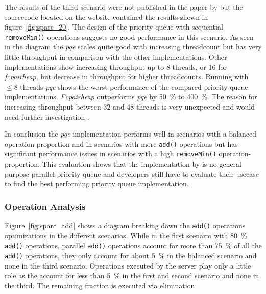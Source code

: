 The results of the third scenario were not published in the paper by \citeauthor{calciu_adaptive_2014} but the sourcecode located on the  website contained the results shown in figure~\ref{fig:sparc_20}. The design of the priority queue with sequential \texttt{removeMin()} operations suggests no good performance in this scenario. As seen in the diagram the \textit{pqe} scales quite good with increasing threadcount but has very little throughput in comparison with the other implementations. Other implementations show increasing throughput up to 8 threads, or 16 for \textit{fcpairheap}, but decrease in throughput for higher threadcounts.  Running with $\le 8$ threads \textit{pqe} shows the worst performance of the compared priority queue implementations. \textit{Fcpairheap} outperforms \textit{pqe} by 50~\% to 400~\%. The reason for increasing throughput between 32 and 48 threads is very unexpected and would need further investigation \cite{calciu_adaptive_2014-1}.

In conclusion the \textit{pqe} implementation performs well in scenarios with a balanced operation-proportion and in scenarios with more \texttt{add()} operations but has significant performance issues in scenarios with a high \texttt{removeMin()} operation-proportion. This evaluation shows that the implementation by \citeauthor{calciu_adaptive_2014} is no general purpose parallel priority queue and developers still have to evaluate their usecase to find the best performing priority queue implementation.

\subsubsection{Operation Analysis}

Figure~\ref{fig:sparc_add} shows a diagram breaking down the \texttt{add()} operations optimizations in the different scenarios. While in the first scenario with 80~\% \texttt{add()} operations, parallel \texttt{add()} operations account for more than 75~\% of all the \texttt{add()} operations, they only account for about 5~\% in the balanced scenario and none in the third scenario. Operations executed by the server play only a little role as the account for less than 5~\% in the first and second scenario and none in the third. The remaining fraction is executed via elimination.

